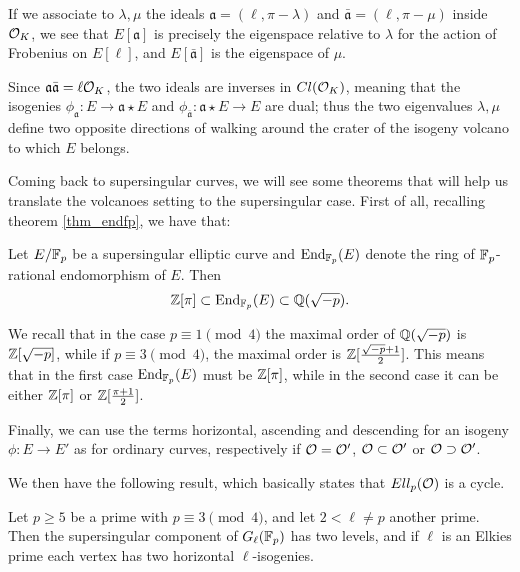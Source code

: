 If we associate to $\lambda,\mu$ the ideals $\mathfrak{a}=(\ell,\pi-\lambda)$ and $\bar{\mathfrak{a}}=(\ell,\pi-\mu)$ inside $\mathcal{O}_K$, we see that $E[\mathfrak{a}]$ is precisely the eigenspace relative to $\lambda$ for the action of Frobenius on $E[\ell]$, and $E[\bar{\mathfrak{a}}]$ is the eigenspace of $\mu$.

Since $\mathfrak{a}\bar{\mathfrak{a}}=\ell\mathcal{O}_K$, the two ideals are inverses in $Cl(\mathcal{O}_K)$, meaning that the isogenies $\phi_{\mathfrak{a}}:E\to \mathfrak{a}\star E$ and $\phi_{\bar{\mathfrak{a}}}:\mathfrak{a}\star E\to E$ are dual; thus the two eigenvalues $\lambda,\mu$ define two opposite directions of walking around the crater of the isogeny volcano to which $E$ belongs.

Coming back to supersingular curves, we will see some theorems that will help us translate the volcanoes setting to the supersingular case. First of all, recalling theorem \ref{thm_endfp}, we have that:

\begin{proposition}
    Let $E/\mathbb{F}_p$ be a supersingular elliptic curve and $\operatorname{End}_{\mathbb{F}_p}(E)$ denote the ring of $\mathbb{F}_p$-rational endomorphism of $E$. Then $$\mathbb{Z}[\pi]\subset \operatorname{End}_{\mathbb{F}_p}(E) \subset \mathbb{Q}(\sqrt{-p}).$$
\end{proposition}

We recall that in the case $p\equiv1\pmod 4$ the maximal order of $\mathbb{Q}(\sqrt{-p})$ is $\mathbb{Z}[\sqrt{-p}]$, while if $p\equiv 3\pmod 4$, the maximal order is $\mathbb{Z}[\frac{\sqrt{-p}+1}{2}]$. This means that in the first case $\operatorname{End}_{\mathbb{F}_p}(E)$ must be $\mathbb{Z}[\pi]$, while in the second case it can be either $\mathbb{Z}[\pi]$ or $\mathbb{Z}[\frac{\pi+1}{2}]$.

Finally, we can use the terms horizontal, ascending and descending for an isogeny $\phi:E\to E'$ as for ordinary curves, respectively if $\mathcal{O}=\mathcal{O}'$, $\mathcal{O}\subset\mathcal{O}'$ or $\mathcal{O}\supset\mathcal{O}'$.

We then have the following result, which basically states that $Ell_p(\mathcal{O})$ is a cycle. 

\begin{theorem}\label{CSIDH_cycle}
    Let $p\ge 5$ be a prime with $p\equiv3\pmod{4}$, and let $2<\ell\neq p$ another prime. Then the supersingular component of $G_\ell(\mathbb{F}_p)$ has two levels, and if $\ell$ is an Elkies prime each vertex has two horizontal $\ell$-isogenies.
\end{theorem}




